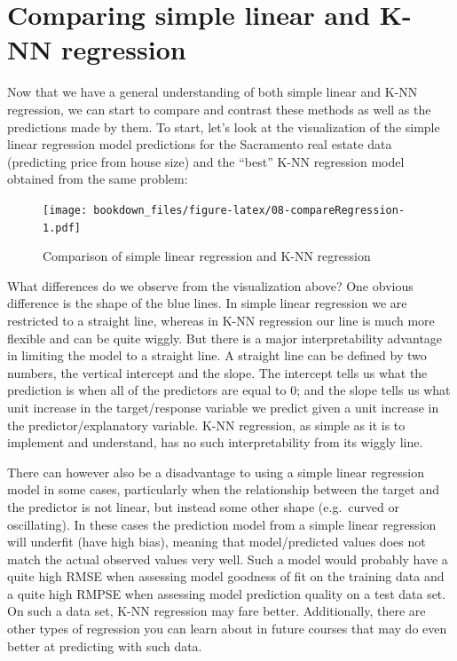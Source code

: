 \documentclass[
]{krantz}
\begin{document}
\hypertarget{comparing-simple-linear-and-k-nn-regression}{%
\section{Comparing simple linear and K-NN regression}\label{comparing-simple-linear-and-k-nn-regression}}

Now that we have a general understanding of both simple linear and K-NN
regression, we can start to compare and contrast these methods as well as the
predictions made by them. To start, let's look at the visualization of the
simple linear regression model predictions for the Sacramento real estate data
(predicting price from house size) and the ``best'' K-NN regression model
obtained from the same problem:

\begin{figure}
\centering
\texttt{[image: bookdown\_files/figure-latex/08-compareRegression-1.pdf]}
\caption{\label{fig:08-compareRegression}Comparison of simple linear regression and K-NN regression}
\end{figure}

What differences do we observe from the visualization above? One obvious
difference is the shape of the blue lines. In simple linear regression we are
restricted to a straight line, whereas in K-NN regression our line is much more
flexible and can be quite wiggly. But there is a major interpretability advantage in limiting the
model to a straight line. A
straight line can be defined by two numbers, the
vertical intercept and the slope. The intercept tells us what the prediction is when
all of the predictors are equal to 0; and the slope tells us what unit increase in the target/response
variable we predict given a unit increase in the predictor/explanatory
variable. K-NN regression, as simple as it is to implement and understand, has no such
interpretability from its wiggly line.

There can however also be a disadvantage to using a simple linear regression
model in some cases, particularly when the relationship between the target and
the predictor is not linear, but instead some other shape (e.g.~curved or oscillating). In
these cases the prediction model from a simple linear regression
will underfit (have high bias), meaning that model/predicted values does not
match the actual observed values very well. Such a model would probably have a
quite high RMSE when assessing model goodness of fit on the training data and
a quite high RMPSE when assessing model prediction quality on a test data
set. On such a data set, K-NN regression may fare better. Additionally, there
are other types of regression you can learn about in future courses that may do
even better at predicting with such data.
\end{document}
